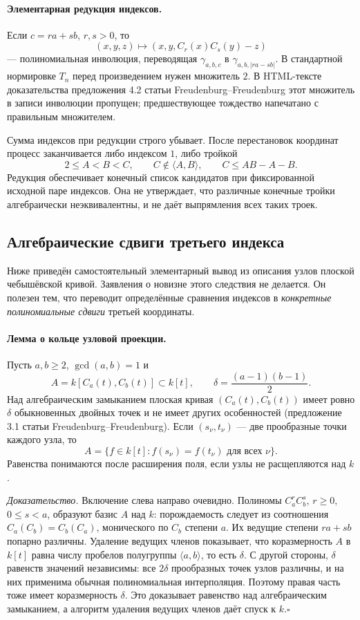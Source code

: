 \paragraph{Элементарная редукция индексов.}
Если $c=ra+sb$, $r,s>0$, то
\[
 (x,y,z)\longmapsto(x,y,C_r(x)C_s(y)-z)
\]
--- полиномиальная инволюция, переводящая
$\gamma_{a,b,c}$ в $\gamma_{a,b,|ra-sb|}$.
В стандартной нормировке $T_n$ перед произведением нужен множитель $2$.
В HTML-тексте доказательства предложения 4.2 статьи Freudenburg--Freudenburg
этот множитель в записи инволюции пропущен; предшествующее тождество
напечатано с правильным множителем.

Сумма индексов при редукции строго убывает. После перестановок координат
процесс заканчивается либо индексом $1$, либо тройкой
\[
 2\leq A<B<C,\qquad C\notin\langle A,B\rangle,
 \qquad C\leq AB-A-B.
\]
Редукция обеспечивает конечный список кандидатов при фиксированной
исходной паре индексов. Она не утверждает, что различные конечные
тройки алгебраически неэквивалентны, и не даёт выпрямления всех таких троек.

\subsection{Алгебраические сдвиги третьего индекса}

Ниже приведён самостоятельный элементарный вывод из описания узлов
плоской чебышёвской кривой. Заявления о новизне этого следствия не делается.
Он полезен тем, что переводит определённые сравнения индексов в
\emph{конкретные полиномиальные сдвиги} третьей координаты.

\paragraph{Лемма о кольце узловой проекции.}
Пусть $a,b\geq2$, $\gcd(a,b)=1$ и
\[
 A=k[C_a(t),C_b(t)]\subset k[t],\qquad
 \delta=\frac{(a-1)(b-1)}2.
\]
Над алгебраическим замыканием плоская кривая
$(C_a(t),C_b(t))$ имеет ровно $\delta$ обыкновенных двойных точек
и не имеет других особенностей (предложение 3.1 статьи
Freudenburg--Freudenburg). Если $(s_\nu,t_\nu)$ --- две прообразные
точки каждого узла, то
\[
 \boxed{\quad A=\{f\in k[t]:f(s_\nu)=f(t_\nu)\text{ для всех }\nu\}.\quad}
\]
Равенства понимаются после расширения поля, если узлы не расщепляются над $k$.

\emph{Доказательство.}
Включение слева направо очевидно. Полиномы
$C_a^rC_b^s$, $r\geq0$, $0\leq s<a$, образуют базис $A$ над $k$:
порождаемость следует из соотношения $C_a(C_b)=C_b(C_a)$, монического
по $C_b$ степени $a$. Их ведущие степени $ra+sb$ попарно различны.
Удаление ведущих членов показывает, что коразмерность $A$ в $k[t]$
равна числу пробелов полугруппы $\langle a,b\rangle$, то есть $\delta$.
С другой стороны, $\delta$ равенств значений независимы: все $2\delta$
прообразных точек узлов различны, и на них применима обычная полиномиальная
интерполяция. Поэтому правая часть тоже имеет коразмерность $\delta$.
Это доказывает равенство над алгебраическим замыканием, а алгоритм
удаления ведущих членов даёт спуск к $k$.\hfill$\square$

